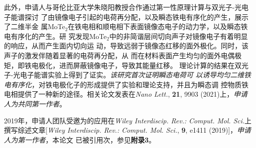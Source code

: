 此外，申请人与哥伦比亚大学朱晓阳教授合作通过第一性原理计算与双光子-光电子能谱探讨
了由镜像电子引起的电荷再分配，以及瞬态铁电有序化的产生，展示了二维半金
属MoTe$_2$在铁电相和顺电相下表面镜像态电子的动力学，以及瞬态铁电有序化的产生。研
究发现MoTe$_2$中的非简谐层间切向声子对镜像电子有着明显的响应，从而产生面内切向运
动，导致远弱于镜像态红移的面外极化。同时，该声子的激发伴随着显著的电荷再分配，从
而在材料表面产生均匀的面外电偶极矩，即铁电极化，进而屏蔽镜像电子，导致其能量红移。
理论计算的结果在双光子-光电子能谱实验上得到了证实。\emph{该研究首次证明瞬态电荷可
  以诱导均匀二维铁电有序化}，对铁电极化子的形成提供了实验和理论支持，并且为瞬态调
控物质铁电相提供了一种新的途径。相关论文发表在\textit{Nano Lett.}, \textbf{21},
9903 (2021)上，\emph{申请人为共同第一作者}。


2019年，申请人团队受邀为\hnamd{}的应用在\textit{Wiley Interdiscip. Rev.:
  Comput. Mol. Sci.}上撰写综述文章[\textit{Wiley Interdiscip. Rev.:
  Comput. Mol. Sci.}, \textbf{9}, e1411 (2019)]，\emph{申请人为第一作者}，本论文
已被引用次，参见\textbf{附录3}。

